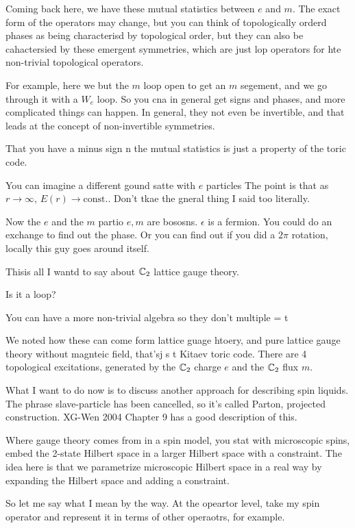 Coming back here,
we have these mutual statistics between $e$ and $m$.
The exact form of the operators may change,
but you can think of topologically orderd phases as being characterisd by
topological order,
but they can also be cahactersied by these emergent symmetries,
which are just lop operators for hte non-trivial topological operators.

For example,
here we but the $m$ loop open to get an $m$ segement,
and we go through it with a $W_e$ loop.
So you cna in general get signs and phases,
and more complicated things can happen.
In general,
they not even be invertible,
and that leads at the concept of non-invertible symmetries.

That you have a minus sign n the mutual statistics is just a property of the
toric code.

You can imagine a different gound satte with $e$ particles
The point is that as $r\to\infty$,
$E(r)\to\mathrm{const}$..
Don't tkae the gneral thing I said too literally.

Now the $e$ and the $m$ partio
$e,m$ are bososns.
$\epsilon$ is a fermion.
You could do an exchange to find out  the phase.
Or you can find out if you did a $2\pi$ rotation,
locally this guy goes around itself.

Thisis all I wantd to say about $\mathbb{C}_2$ lattice gauge theory.

\begin{question}
    Is it a loop?
\end{question}
You can have a more non-trivial algebra so they don't multiple = t

We noted how these can come form lattice guage htoery,
and pure lattice gauge theory without magnteic field,
that'sj s t Kitaev toric code.
There are 4 topological excitations,
generated by the $\mathbb{C}_2$ charge $e$
and the $\mathbb{C}_2$ flux $m$.

What I want to do now is to discuss another approach for describing spin
liquids.
The phrase slave-particle has been cancelled,
so it's called Parton, projected construction.
XG-Wen 2004 Chapter 9 has a good description of this.

Where gauge theory comes from in a spin model,
you stat with microscopic spins,
embed the 2-state Hilbert space in a larger Hilbert space with a constraint.
The idea here is that we parametrize microscopic Hilbert space in a real way by
expanding the Hilbert space and adding a constraint.

So let me say what I mean by the way.
At the opeartor level,
take my spin operator and represent it in terms of other operaotrs,
for example.

